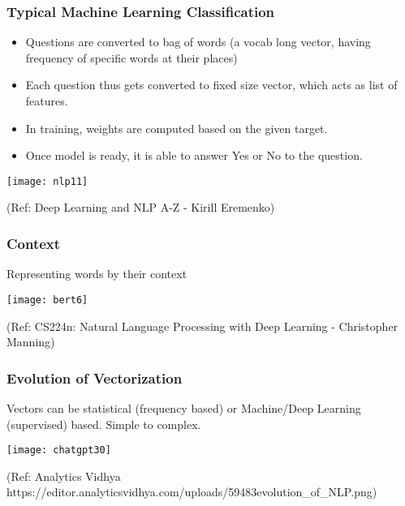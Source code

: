 \begin{frame}[fragile]\frametitle{Typical Machine Learning Classification}
	\begin{itemize}
	\item Questions are converted to bag of words (a vocab long vector, having frequency of specific words at their places)
		\item Each question thus gets converted to fixed size vector, which acts as list of features.
		\item In training, weights are computed based on the given target.
		\item Once model is ready, it is able to answer Yes or No to the question.
			\end{itemize}
\begin{center}
\texttt{[image: nlp11]}

\tiny{(Ref: Deep Learning and NLP A-Z - Kirill Eremenko)}
\end{center}

\end{frame}


\begin{frame}[fragile]\frametitle{Context}

Representing words by their context

\begin{center}
\texttt{[image: bert6]}
\end{center}		  


{\tiny (Ref: CS224n: Natural Language Processing with Deep Learning - Christopher Manning)}

\end{frame}

\begin{frame}[fragile]\frametitle{Evolution of Vectorization}

Vectors can be statistical (frequency based) or Machine/Deep Learning (supervised) based. Simple to complex.

\begin{center}
\texttt{[image: chatgpt30]}
\end{center}				
{\tiny (Ref: Analytics Vidhya https://editor.analyticsvidhya.com/uploads/59483evolution\_of\_NLP.png)}

\end{frame}


